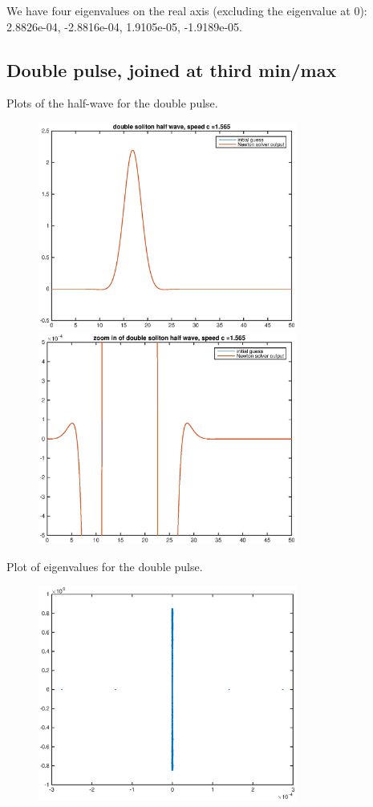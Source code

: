 \documentclass[12pt]{article}
\begin{document}
We have four eigenvalues on the real axis (excluding the eigenvalue at 0): 2.8826e-04, -2.8816e-04, 1.9105e-05, -1.9189e-05. 

\subsection*{Double pulse, joined at third min/max}
Plots of the half-wave for the double pulse.
	\begin{figure}[H]
	\includegraphics[width=8.5cm]{D3_fd50_half.eps}
	\includegraphics[width=8.5cm]{D3_fd50_half_zoom.eps}
	\end{figure}

Plot of eigenvalues for the double pulse.
	\begin{figure}[H]
	\includegraphics[width=8.5cm]{D3_fd50_val.eps}
	\end{figure}
\end{document}
